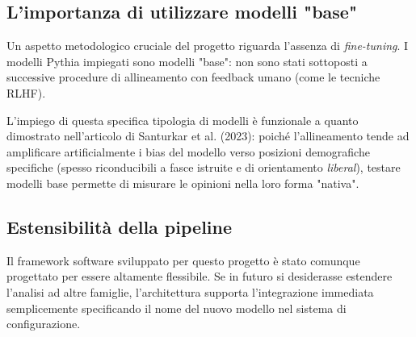 \documentclass[../relazione.tex]{subfiles}
\begin{document}
\subsection{L'importanza di utilizzare modelli "base"}

Un aspetto metodologico cruciale del progetto riguarda l'assenza di \emph{fine-tuning}. I modelli Pythia impiegati sono modelli "base": non sono stati sottoposti a successive procedure di allineamento con feedback umano (come le tecniche RLHF). 

L'impiego di questa specifica tipologia di modelli è funzionale a quanto dimostrato nell'articolo di Santurkar et al. (2023): poiché l'allineamento tende ad amplificare artificialmente i bias del modello verso posizioni demografiche specifiche (spesso riconducibili a fasce istruite e di orientamento \emph{liberal}), testare modelli base permette di misurare le opinioni nella loro forma "nativa". 

\subsection{Estensibilità della pipeline}
Il framework software sviluppato per questo progetto è stato comunque progettato per essere altamente flessibile. Se in futuro si desiderasse estendere l'analisi ad altre famiglie, l'architettura supporta l'integrazione immediata semplicemente specificando il nome del nuovo modello nel sistema di configurazione.
\end{document}
